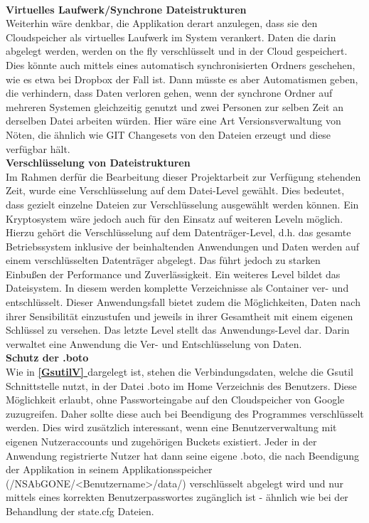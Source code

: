\documentclass[12pt,a4paper,bibliography=totocnumbered,listof=totocnumbered]{scrartcl}
\newcommand*{\fullref}[1]{\textbf{\hyperref[{#1}]{\ref*{#1} \nameref*{#1}}}}
\begin{document}
\\\textbf{Virtuelles Laufwerk/Synchrone Dateistrukturen}\\
Weiterhin wäre denkbar, die Applikation derart anzulegen, dass sie den Cloudspeicher als virtuelles Laufwerk im System verankert. Daten die darin abgelegt werden, werden on the fly verschlüsselt und in der Cloud gespeichert. Dies könnte auch mittels eines automatisch synchronisierten Ordners geschehen, wie es etwa bei Dropbox der Fall ist. Dann müsste es aber Automatismen geben, die verhindern, dass Daten verloren gehen, wenn der synchrone Ordner auf mehreren Systemen gleichzeitig genutzt und zwei Personen zur selben Zeit an derselben Datei arbeiten würden. Hier wäre eine Art Versionsverwaltung von Nöten, die ähnlich wie GIT Changesets von den Dateien erzeugt und diese verfügbar hält.
\\\textbf{Verschlüsselung von Dateistrukturen}\\
Im Rahmen derfür die Bearbeitung dieser Projektarbeit zur Verfügung stehenden Zeit, wurde eine Verschlüsselung auf dem Datei-Level gewählt. Dies bedeutet, dass gezielt einzelne Dateien zur Verschlüsselung ausgewählt werden können. Ein Kryptosystem wäre jedoch auch für den Einsatz auf weiteren Leveln möglich. Hierzu gehört die Verschlüsselung auf dem Datenträger-Level, d.h. das gesamte Betriebssystem inklusive der beinhaltenden Anwendungen und Daten werden auf einem verschlüsselten Datenträger abgelegt. Das führt jedoch zu starken Einbußen der Performance und Zuverlässigkeit. Ein weiteres Level bildet das Dateisystem. In diesem werden komplette Verzeichnisse als Container ver- und entschlüsselt. Dieser Anwendungsfall bietet zudem die Möglichkeiten, Daten nach ihrer Sensibilität einzustufen und jeweils in ihrer Gesamtheit mit einem eigenen Schlüssel zu versehen. Das letzte Level stellt das Anwendungs-Level dar. Darin verwaltet eine Anwendung die Ver- und Entschlüsselung von Daten. \cite{38}
\\\textbf{Schutz der .boto}\\
Wie in \fullref{GsutilV} dargelegt ist, stehen die Verbindungsdaten, welche die Gsutil Schnittstelle nutzt, in der Datei .boto im Home Verzeichnis des Benutzers. Diese Möglichkeit erlaubt, ohne Passworteingabe auf den Cloudspeicher von Google zuzugreifen. Daher sollte diese auch bei Beendigung des Programmes verschlüsselt werden. Dies wird zusätzlich interessant, wenn eine Benutzerverwaltung mit eigenen Nutzeraccounts und zugehörigen Buckets existiert. Jeder in der Anwendung registrierte Nutzer hat dann seine eigene .boto, die nach Beendigung der Applikation in seinem Applikationsspeicher (/NSAbGONE/\textless Benutzername\textgreater /data/) verschlüsselt abgelegt wird und nur mittels eines korrekten Benutzerpasswortes zugänglich ist - ähnlich wie bei der Behandlung der state.cfg Dateien.
\end{document}
